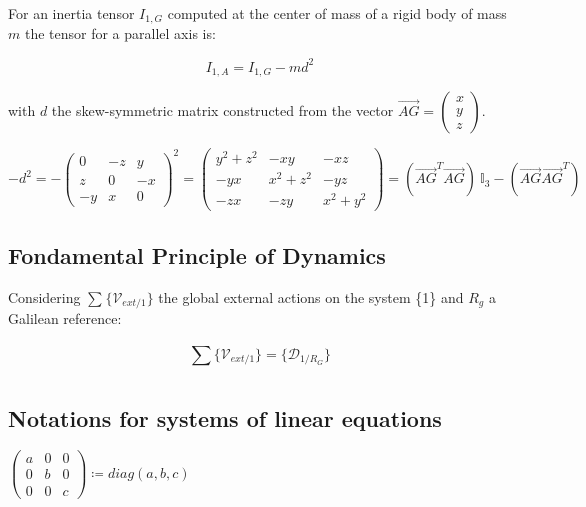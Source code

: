 \documentclass[\main/main.tex]{subfiles}
\begin{document}
For an inertia tensor $I_{1, G}$ computed at the center of mass of a rigid body of mass $m$ the tensor for a parallel axis is:

\begin{equation}
 \label{appendix:notation:parallel_axis}
 I_{1, A} = I_{1, G} - m d^2
\end{equation}

with $d$ the skew-symmetric matrix constructed from the vector $\overrightarrow{AG} = \begin{pmatrix}
x \\
y \\
z
\end{pmatrix}$.

{\centering
 $ -d^2 = -\begin{pmatrix}
 0 & -z & y \\
 z & 0 & -x \\
 -y & x & 0
 \end{pmatrix}^2
 = \begin{pmatrix}
 y^2 + z^2 & -xy & -xz \\
 -yx & x^2 + z^2 & -yz \\
 -zx & -zy & x^2 + y^2
 \end{pmatrix}
 = (\overrightarrow{AG}^T \overrightarrow{AG}) \ \mathbb{I}_3 - (\overrightarrow{AG} \overrightarrow{AG}^T)$
 \par}


\subsection{Fondamental Principle of Dynamics}

Considering $\sum_{}^{} \{ \mathcal{V}_{ext/1} \}$ the global external actions on the system \{1\} and $R_g$ a Galilean reference:

\begin{equation}
 \sum_{}^{} \{ \mathcal{V}_{ext/1} \} = \{ \mathcal{D}_{1/R_G} \}
 \label{appendix:notation:fpd}
\end{equation}


\subsection{Notations for systems of linear equations}
\label{notation:matrix}
{\centering
 $ \begin{pmatrix}
  a & 0 & 0 \\
  0 & b & 0 \\
  0 & 0 & c
 \end{pmatrix}
 \coloneqq diag(a, b, c)$
 \par}
\end{document}
